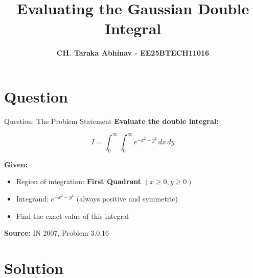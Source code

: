 \documentclass[12pt, aspectratio=169]{beamer}
\title{\bfseries Evaluating the Gaussian Double Integral}
\author{\textbf{CH. Taraka Abhinav - EE25BTECH11016}}
\institute{}
\date{}
\begin{document}
\begin{frame}
  \titlepage
\end{frame}


\section{Question}

\begin{frame}{Question: The Problem Statement}
\textbf{Evaluate the double integral:}

\[
I = \int_0^\infty \int_0^\infty e^{-x^2 - y^2} \, dx\,dy
\]

\vspace{0.5cm}

\textbf{Given:}
\begin{itemize}
    \item Region of integration: \textbf{First Quadrant} $(x \ge 0, y \ge 0)$
    \item Integrand: $e^{-x^2 - y^2}$ (always positive and symmetric)
    \item Find the exact value of this integral
\end{itemize}

\vspace{0.3cm}

\textbf{Source:} IN 2007, Problem 3.0.16
\end{frame}


\section{Solution}
\end{document}
